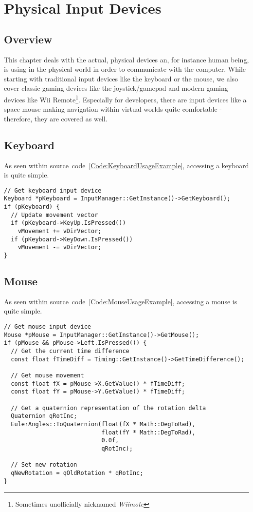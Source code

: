 \chapter{Physical Input Devices}
\label{Chapter:PhysicalInputDevices}




\section{Overview}
This chapter deals with the actual, physical devices an, for instance human being, is using in the physical world in order to communicate with the computer. While starting with traditional input devices like the keyboard or the mouse, we also cover classic gaming devices like the joystick/gamepad and modern gaming devices like Wii Remote\footnote{Sometimes unofficially nicknamed \emph{Wiimote}}. Especially for developers, there are input devices like a space mouse making navigation within virtual worlds quite comfortable - therefore, they are covered as well.




\section{Keyboard}
As seen within source~code~\ref{Code:KeyboardUsageExample}, accessing a keyboard is quite simple.
\begin{lstlisting}[float=htb,label=Code:KeyboardUsageExample,caption={Keyboard usage example}]
// Get keyboard input device
Keyboard *pKeyboard = InputManager::GetInstance()->GetKeyboard();
if (pKeyboard) {
  // Update movement vector
  if (pKeyboard->KeyUp.IsPressed())
    vMovement += vDirVector;
  if (pKeyboard->KeyDown.IsPressed())
    vMovement -= vDirVector;
}
\end{lstlisting}




\section{Mouse}
As seen within source~code~\ref{Code:MouseUsageExample}, accessing a mouse is quite simple.
\begin{lstlisting}[float=htb,label=Code:MouseUsageExample,caption={Mouse usage example}]
// Get mouse input device
Mouse *pMouse = InputManager::GetInstance()->GetMouse();
if (pMouse && pMouse->Left.IsPressed()) {
  // Get the current time difference
  const float fTimeDiff = Timing::GetInstance()->GetTimeDifference();

  // Get mouse movement
  const float fX = pMouse->X.GetValue() * fTimeDiff;
  const float fY = pMouse->Y.GetValue() * fTimeDiff;

  // Get a quaternion representation of the rotation delta
  Quaternion qRotInc;
  EulerAngles::ToQuaternion(float(fX * Math::DegToRad),
                            float(fY * Math::DegToRad),
                            0.0f,
                            qRotInc);

  // Set new rotation
  qNewRotation = qOldRotation * qRotInc;
}
\end{lstlisting}




